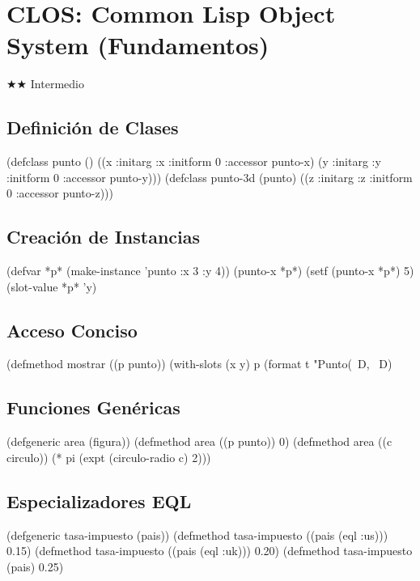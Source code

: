 \chapter{CLOS: Common Lisp Object System (Fundamentos)}
\label{chap:clos-basics}
{\huge$\bigstar$}{\huge$\bigstar$} Intermedio

\section{Definición de Clases}
\begin{lispcode}
(defclass punto ()
  ((x :initarg :x :initform 0 :accessor punto-x)
   (y :initarg :y :initform 0 :accessor punto-y)))
(defclass punto-3d (punto) ((z :initarg :z :initform 0 :accessor punto-z)))
\end{lispcode}

\section{Creación de Instancias}
\begin{lispcode}
(defvar *p* (make-instance 'punto :x 3 :y 4))
(punto-x *p*)
(setf (punto-x *p*) 5)
(slot-value *p* 'y)
\end{lispcode}

\section{Acceso Conciso}
\begin{lispcode}
(defmethod mostrar ((p punto))
  (with-slots (x y) p (format t "Punto(~D, ~D)~%
\end{lispcode}

\section{Funciones Genéricas}
\begin{lispcode}
(defgeneric area (figura))
(defmethod area ((p punto)) 0)
(defmethod area ((c circulo)) (* pi (expt (circulo-radio c) 2)))
\end{lispcode}

\section{Especializadores EQL}
\begin{lispcode}
(defgeneric tasa-impuesto (pais))
(defmethod tasa-impuesto ((pais (eql :us))) 0.15)
(defmethod tasa-impuesto ((pais (eql :uk))) 0.20)
(defmethod tasa-impuesto (pais) 0.25)
\end{lispcode}

